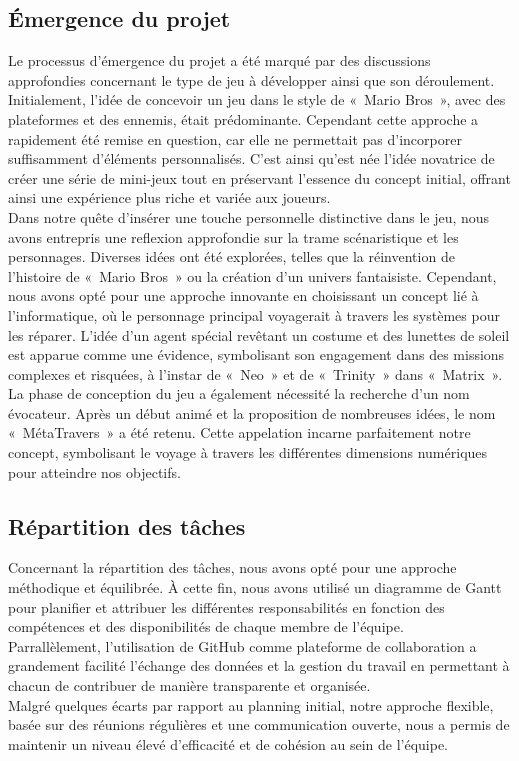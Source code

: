 \documentclass[12pt,a4paper]{article}
\begin{document}
        \subsection{Émergence du projet}
            \tabto{1cm} Le processus d'émergence du projet a été marqué par des discussions approfondies concernant le type de jeu à développer ainsi que son déroulement. Initialement, l'idée de concevoir un jeu dans le style de «~Mario Bros~», avec des plateformes et des ennemis, était prédominante. Cependant cette approche a rapidement été remise en question, car elle ne permettait pas d'incorporer suffisamment d'éléments personnalisés. C'est ainsi qu'est née l'idée novatrice de créer une série de mini-jeux tout en préservant l'essence du concept initial, offrant ainsi une expérience plus riche et variée aux joueurs.\\

            Dans notre quête d'insérer une touche personnelle distinctive dans le jeu, nous avons entrepris une reflexion approfondie sur la trame scénaristique et les personnages. Diverses idées ont été explorées, telles que la réinvention de l'histoire de «~Mario Bros~» ou la création d'un univers fantaisiste. Cependant, nous avons opté pour une approche innovante en choisissant un concept lié à l'informatique, où le personnage principal voyagerait à travers les systèmes pour les réparer. L'idée d'un agent spécial revêtant un costume et des lunettes de soleil est apparue comme une évidence, symbolisant son engagement dans des missions complexes et risquées, à l'instar de «~Neo~» et de «~Trinity~» dans «~Matrix~».\\

            La phase de conception du jeu a également nécessité la recherche d'un nom évocateur. Après un début animé et la proposition de nombreuses idées, le nom «~MétaTravers~» a été retenu. Cette appelation incarne parfaitement notre concept, symbolisant le voyage à travers les différentes dimensions numériques pour atteindre nos objectifs.\\
            
        \subsection{Répartition des tâches}
            \tabto{1cm} Concernant la répartition des tâches, nous avons opté pour une approche méthodique et équilibrée. À cette fin, nous avons utilisé un diagramme de Gantt pour planifier et attribuer les différentes responsabilités en fonction des compétences et des disponibilités de chaque membre de l'équipe.\\Parrallèlement, l'utilisation de GitHub comme plateforme de collaboration a grandement facilité l'échange des données et la gestion du travail en permettant à chacun de contribuer de manière transparente et organisée.\\Malgré quelques écarts par rapport au planning initial, notre approche flexible, basée sur des réunions régulières et une communication ouverte, nous a permis de maintenir un niveau élevé d'efficacité et de cohésion au sein de l'équipe.\\
\end{document}
